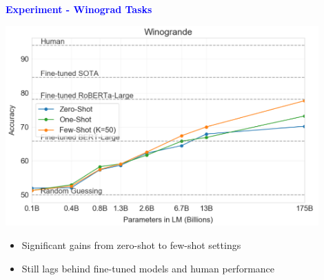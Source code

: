 \documentclass[professionalfont]{beamer}
\begin{document}
\begin{frame}

\begin{center}
    { \textbf{\textcolor{blue}{ {\fontsize{12}{14}\selectfont Experiment - Winograd Tasks} }} }
\end{center}

\begin{center}
    \includegraphics[width=0.9\textwidth]{figure/3-5.png}
\end{center}

{\fontsize{10}{14}\selectfont 
\begin{itemize}
    \item Significant gains from zero-shot to few-shot settings

    \item Still lags behind fine-tuned models and human performance

\end{itemize}
}

\end{frame}
\end{document}
